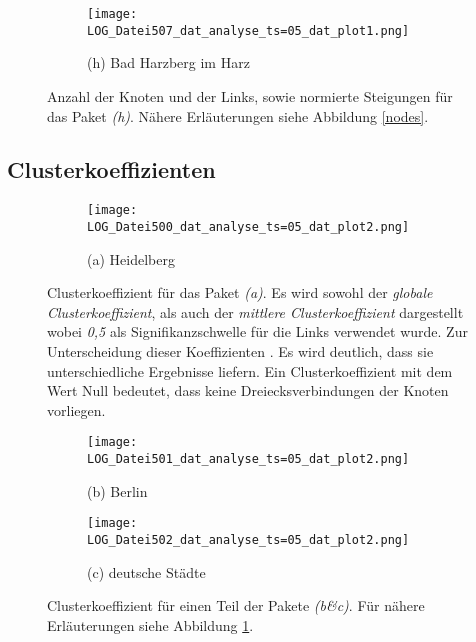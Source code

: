 \documentclass[fontsize=11pt, twoside, a4paper]{scrartcl}
\begin{document}
\begin{figure}
	\begin{minipage}[t]{0.75\textwidth}
		\begin{figure}[H]
		\texttt{[image: LOG\_Datei507\_dat\_analyse\_ts=05\_dat\_plot1.png]}
		\caption*{(h) Bad Harzberg im Harz}
		\end{figure}
	\end{minipage}
\caption{Anzahl der Knoten und der Links, sowie normierte Steigungen für das Paket \textit{(h)}. Nähere Erläuterungen siehe Abbildung \ref{nodes}.}
\end{figure}


\subsection{Clusterkoeffizienten}
\label{sec:St10}
\begin{figure}[H]
\centering
	\begin{minipage}[t]{0.75\textwidth}
		\begin{figure}[H]
		\texttt{[image: LOG\_Datei500\_dat\_analyse\_ts=05\_dat\_plot2.png]}
		\caption*{(a) Heidelberg}
		\end{figure}
	\end{minipage}
\caption{Clusterkoeffizient für das Paket \textit{(a)}. Es wird sowohl der \textit{globale Clusterkoeffizient}, als auch der \textit{mittlere Clusterkoeffizient} dargestellt wobei \textit{0,5} als Signifikanzschwelle für die Links verwendet wurde. Zur Unterscheidung dieser Koeffizienten . Es wird deutlich, dass sie unterschiedliche Ergebnisse liefern. Ein Clusterkoeffizient mit dem Wert Null bedeutet, dass keine Dreiecksverbindungen der Knoten vorliegen.}	
\label{cluster}
\end{figure}

\begin{figure}
	\begin{minipage}[t]{0.75\textwidth}
		\begin{figure}[H]
		\texttt{[image: LOG\_Datei501\_dat\_analyse\_ts=05\_dat\_plot2.png]}
		\caption*{(b) Berlin}
		\end{figure}
	\end{minipage}
	\begin{minipage}[t]{0.75\textwidth}
		\begin{figure}[H]
		\texttt{[image: LOG\_Datei502\_dat\_analyse\_ts=05\_dat\_plot2.png]}
		\caption*{(c) deutsche Städte}
		\end{figure}
	\end{minipage}
\caption{Clusterkoeffizient für einen Teil der Pakete \textit{(b\&c)}. Für nähere Erläuterungen siehe Abbildung \ref{cluster}.}
\end{figure}
\end{document}
